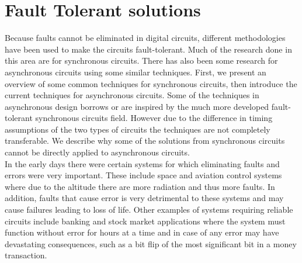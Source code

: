 \documentclass[12pt]{report}
\begin{document}
\section{Fault Tolerant solutions}

Because faults cannot be eliminated in digital circuits, different methodologies have been used to make the circuits fault-tolerant. Much of the research done in this area are for synchronous circuits. There has also been some research for asynchronous circuits using some similar techniques. First, we present an overview of some common techniques for synchronous circuits, then introduce the current techniques for asynchronous circuits. Some of the techniques in asynchronous design borrows or are inspired by the much more developed fault-tolerant synchronous circuits field. However due to the difference in timing assumptions of the two types of circuits the techniques are not completely transferable. We describe why some of the solutions from synchronous circuits cannot be directly applied to asynchronous circuits.\\

In the early days there were certain systems for which eliminating faults and errors were very important. These include space and aviation control systems where due to the altitude there are more radiation and thus more faults. In addition, faults that cause error is very detrimental to these systems and may cause failures leading to loss of life. Other examples of systems requiring reliable circuits include banking and stock market applications where the system must function without error for hours at a time and in case of any error may have devastating consequences, such as a bit flip of the most significant bit in a money transaction. \\
\end{document}
